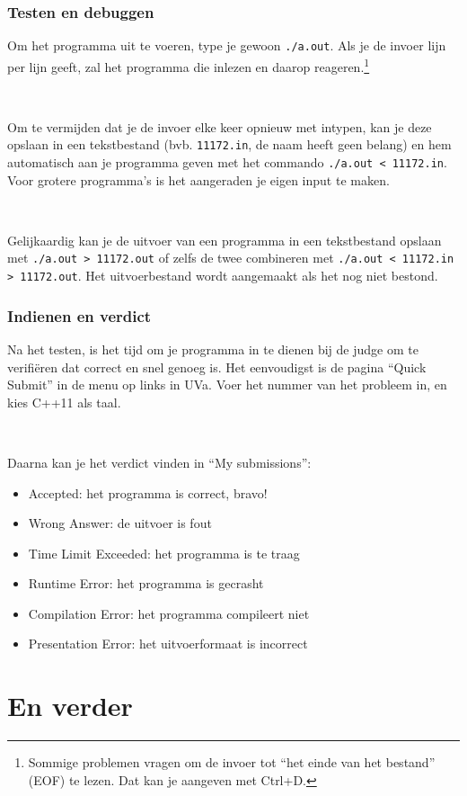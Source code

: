 \documentclass[12pt]{beamer}
\begin{document}
\begin{frame}[fragile]
\frametitle{Testen en debuggen}
    Om het programma uit te voeren, type je gewoon \lstinline|./a.out|. Als je de invoer lijn per lijn geeft, zal het programma die inlezen en daarop reageren.\footnote{Sommige problemen vragen om de invoer tot ``het einde van het bestand'' (EOF) te lezen. Dat kan je aangeven met Ctrl+D.}

~

Om te vermijden dat je de invoer elke keer opnieuw met intypen, kan je deze opslaan in een tekstbestand (bvb. \lstinline|11172.in|, de naam heeft geen belang) en hem automatisch aan je programma geven met het commando \lstinline|./a.out < 11172.in|. Voor grotere programma's is het aangeraden je eigen input te maken.

~

    Gelijkaardig kan je de uitvoer van een programma in een tekstbestand opslaan met \lstinline|./a.out > 11172.out| of zelfs de twee combineren met \lstinline|./a.out < 11172.in > 11172.out|. Het uitvoerbestand wordt aangemaakt als het nog niet bestond.
\end{frame}

\begin{frame}
\frametitle{Indienen en verdict}
Na het testen, is het tijd om je programma in te dienen bij de judge om te verifiëren dat correct en snel genoeg is. Het eenvoudigst is de pagina ``Quick Submit'' in de menu op links in UVa. Voer het nummer van het probleem in, en kies C++11 als taal.

~

Daarna kan je het verdict vinden in ``My submissions'':
\begin{itemize}
\item Accepted: het programma is correct, bravo!
\item Wrong Answer: de uitvoer is fout
\item Time Limit Exceeded: het programma is te traag
\item Runtime Error: het programma is gecrasht
\item Compilation Error: het programma compileert niet
\item Presentation Error: het uitvoerformaat is incorrect
\end{itemize}
\end{frame}

\section{En verder}
\end{document}

